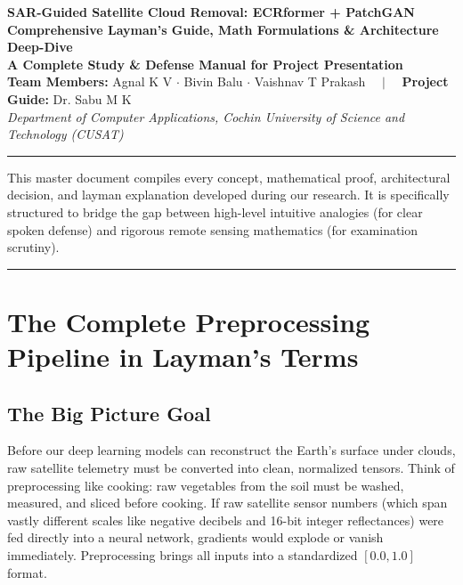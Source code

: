 \documentclass[11pt,a4paper]{article}
\begin{document}
\begin{center}
    {\LARGE \textbf{\textcolor{primary}{SAR-Guided Satellite Cloud Removal: ECRformer + PatchGAN}}}\\[0.4em]
    {\Large \textbf{Comprehensive Layman's Guide, Math Formulations \& Architecture Deep-Dive}}\\[0.6em]
    {\normalsize \textbf{A Complete Study \& Defense Manual for Project Presentation}}\\[0.8em]
    {\small \textbf{Team Members:} Agnal K V $\cdot$ Bivin Balu $\cdot$ Vaishnav T Prakash $\quad|\quad$ \textbf{Project Guide:} Dr. Sabu M K}\\[0.2em]
    {\small \textit{Department of Computer Applications, Cochin University of Science and Technology (CUSAT)}}
\end{center}
\vspace{-0.5em}
\noindent\rule{\linewidth}{1.2pt}

\vspace{0.8em}
\begin{tcolorbox}[colback=primary!5!white,colframe=primary,title=\textbf{Document Purpose \& Pedagogical Philosophy},fonttitle=\bfseries]
This master document compiles every concept, mathematical proof, architectural decision, and layman explanation developed during our research. It is specifically structured to bridge the gap between high-level intuitive analogies (for clear spoken defense) and rigorous remote sensing mathematics (for examination scrutiny).
\end{tcolorbox}

\tableofcontents
\vspace{1em}
\noindent\rule{\linewidth}{0.6pt}

\section{The Complete Preprocessing Pipeline in Layman's Terms}

\subsection{The Big Picture Goal}
Before our deep learning models can reconstruct the Earth's surface under clouds, raw satellite telemetry must be converted into clean, normalized tensors. Think of preprocessing like cooking: raw vegetables from the soil must be washed, measured, and sliced before cooking. If raw satellite sensor numbers (which span vastly different scales like negative decibels and 16-bit integer reflectances) were fed directly into a neural network, gradients would explode or vanish immediately. Preprocessing brings all inputs into a standardized $[0.0, 1.0]$ format.
\end{document}
